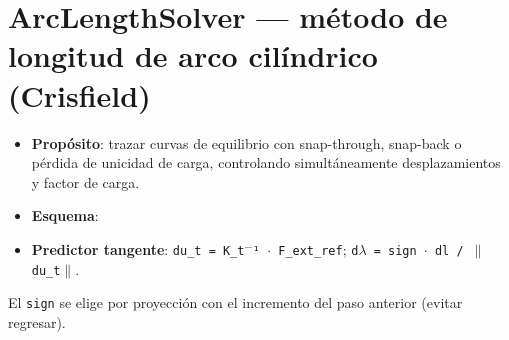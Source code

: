 \documentclass[11pt,letterpaper,oneside]{report}
\begin{document}
\section{ArcLengthSolver --- método de longitud de arco cilíndrico (Crisfield)}

\begin{itemize}
  \item \textbf{Propósito}: trazar curvas de equilibrio con snap-through, snap-back o pérdida de unicidad de carga, controlando simultáneamente desplazamientos y factor de carga.
  \item \textbf{Esquema}:
  \item \textbf{Predictor tangente}: \texttt{du\_t = K\_t\ensuremath{^{-}}¹ \ensuremath{\cdot} F\_ext\_ref}; \texttt{d\ensuremath{\lambda} = sign \ensuremath{\cdot} dl / \ensuremath{\|}du\_t\ensuremath{\|}}.
\end{itemize}
    El \texttt{sign} se elige por proyección con el incremento del paso anterior (evitar regresar).
\end{document}
